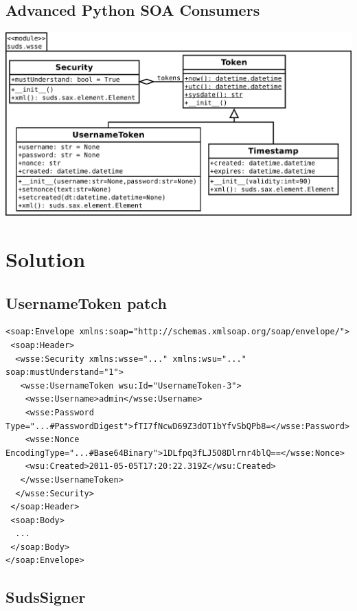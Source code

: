 \documentclass{beamer}
\begin{document}
\subsection{Advanced Python SOA Consumers}

\begin{frame}
\begin{center}
 \includegraphics[width=\textwidth]{images/clsdSudsWsse.pdf}
\end{center}
\end{frame}

\section{Solution}

\subsection{UsernameToken patch}

\begin{frame}[fragile]
\begin{lstlisting}[basicstyle=\footnotesize\ttfamily]
<soap:Envelope xmlns:soap="http://schemas.xmlsoap.org/soap/envelope/">
 <soap:Header>
  <wsse:Security xmlns:wsse="..." xmlns:wsu="..." soap:mustUnderstand="1">
   <wsse:UsernameToken wsu:Id="UsernameToken-3">
    <wsse:Username>admin</wsse:Username>
    <wsse:Password Type="...#PasswordDigest">fTI7fNcwD69Z3dOT1bYfvSbQPb8=</wsse:Password>
    <wsse:Nonce EncodingType="...#Base64Binary">1DLfpq3fLJ5O8Dlrnr4blQ==</wsse:Nonce>
    <wsu:Created>2011-05-05T17:20:22.319Z</wsu:Created>
   </wsse:UsernameToken>
  </wsse:Security>
 </soap:Header>
 <soap:Body>
  ...
 </soap:Body>
</soap:Envelope>
\end{lstlisting}
\end{frame}

\subsection{SudsSigner}
\end{document}
